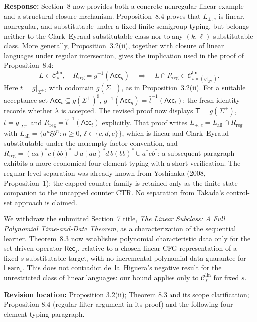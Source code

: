 \documentclass[
  10pt,
  a4paper,
]{article}
\begin{document}
\textbf{Response:} Section~8 now provides both a concrete
nonregular linear example and a structural closure mechanism.
Proposition~8.4 proves that $L_{\pm,e}$ is linear, nonregular,
and substitutable under a fixed finite-semigroup typing, but belongs
neither to the Clark--Eyraud substitutable class nor to any
$(k,\ell)$-substitutable class. More generally, Proposition~3.2(ii),
together with closure of linear languages under regular intersection,
gives the implication used in the proof of Proposition~8.4:
\[
 L\in\mathcal C_s^{\mathrm{lin}},\quad R_{\mathrm{reg}}=g^{-1}(\mathsf{Acc}_{g})
 \quad\Longrightarrow\quad L\cap R_{\mathrm{reg}}\in\mathcal C_{s\times(g|_{\Sigma^+})}^{\mathrm{lin}}.
\]
Here $t=g|_{\Sigma^+}$, with codomain $g(\Sigma^+)$, as in
Proposition~3.2(ii). For a suitable acceptance set
$\mathsf{Acc}_t\subseteq g(\Sigma^+)^\sharp$,
$g^{-1}(\mathsf{Acc}_g)=\widehat t^{-1}(\mathsf{Acc}_t)$:
the fresh identity records whether $\lambda$ is accepted.
The revised proof now displays $\mathsf T=g(\Sigma^+)$,
$t=g|_{\Sigma^+}$ and
$R_{\mathrm{reg}}=\widehat t^{-1}(\mathsf{Acc}_t)$ explicitly.
That proof writes $L_{\pm,e}=L_{\mathrm{all}}\cap R_{\mathrm{reg}}$ with
$L_{\mathrm{all}}=\{a^n\xi b^n:n\ge0,\ \xi\in\{c,d,e\}\}$, which is linear
and Clark--Eyraud substitutable under the nonempty-factor convention, and
$R_{\mathrm{reg}}=(aa)^*c(bb)^*\cup a(aa)^*d\,b(bb)^*\cup a^*eb^*$;
a subsequent paragraph exhibits a more economical four-element typing with
a short verification. The regular-level separation was already known from
Yoshinaka (2008, Proposition~1); the capped-counter family is retained
only as the finite-state companion to the uncapped counter
$\mathrm{CTR}$. No separation from Takada's control-set approach
is claimed.

We withdraw the submitted Section~7 title,
\emph{The Linear Subclass: A Full Polynomial Time-and-Data Theorem},
as a characterization of the sequential learner.
Theorem~8.3 now establishes polynomial characteristic data only for
the set-driven operator $\mathsf{Rec}_s$, relative to a chosen linear
CFG representation of a fixed-$s$ substitutable target, with no
incremental polynomial-data guarantee for $\mathsf{Learn}_s$. This does
not contradict de~la~Higuera's negative result for the unrestricted class
of linear languages: our bound applies only to
$\mathcal C_s^{\mathrm{lin}}$ for fixed $s$.

\textbf{Revision location:} Proposition 3.2(ii); Theorem 8.3 and its scope
clarification; Proposition 8.4 (regular-filter argument in its proof)
and the following four-element typing paragraph.
\end{document}
